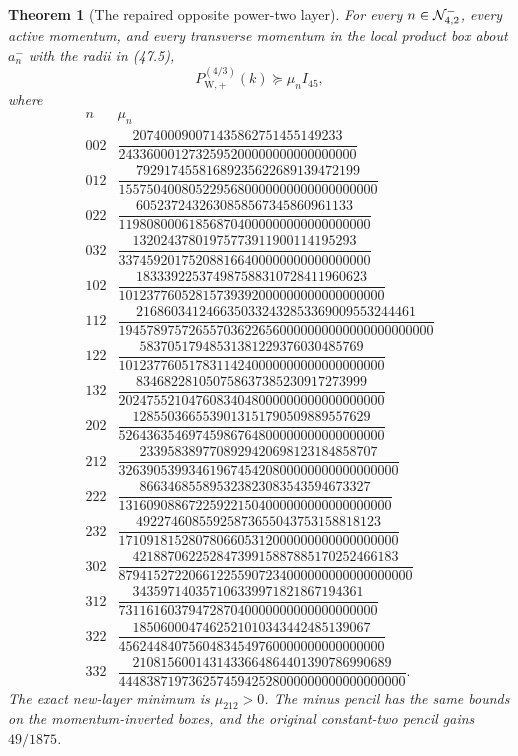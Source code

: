 \documentclass[11pt,oneside]{article}
\newtheorem{theorem}{Theorem}[section]
\theoremstyle{definition}
\theoremstyle{remark}
\begin{document}
\begin{theorem}[The repaired opposite power-two layer]
\label{thm:newv47-sixteen-charts}
For every \(n\in{\cal N}_{4,2}^{-}\), every active momentum, and
every transverse momentum in the local product box about \(a_n^-\)
with the radii in (47.5),
\[
 P_{\mathrm W,+}^{(4/3)}(k)\succeq\mu_n I_{45},        \tag{47.9}
\]
where
\[
\begin{array}{c|c}
n&\mu_n\\ \hline
002&\dfrac{207400090071435862751455149233}
{2433600012732595200000000000000000}\\[5pt]
012&\dfrac{79291745581689235622689139472199}
{1557504008052295680000000000000000000}\\[5pt]
022&\dfrac{6052372432630858567345860961133}
{119808000618568704000000000000000000}\\[5pt]
032&\dfrac{13202437801975773911900114195293}
{337459201752088166400000000000000000}\\[5pt]
102&\dfrac{183339225374987588310728411960623}
{10123776052815739392000000000000000000}\\[5pt]
112&\dfrac{2168603412466350332432853369009553244461}
{194578975726557036226560000000000000000000000}\\[5pt]
122&\dfrac{58370517948531381229376030485769}
{10123776051783114240000000000000000000}\\[5pt]
132&\dfrac{834682281050758637385230917273999}
{20247552104760834048000000000000000000}\\[5pt]
202&\dfrac{1285503665539013151790509889557629}
{52643635469745986764800000000000000000}\\[5pt]
212&\dfrac{2339583897708929420698123184858707}
{3263905399346196745420800000000000000000}\\[5pt]
222&\dfrac{866346855895323823083543594673327}
{131609088672259221504000000000000000000}\\[5pt]
232&\dfrac{49227460855925873655043753158818123}
{1710918152807806605312000000000000000000}\\[5pt]
302&\dfrac{42188706225284739915887885170252466183}
{879415272206612255907234000000000000000000}\\[5pt]
312&\dfrac{343597140357106339971821867194361}
{7311616037947287040000000000000000000}\\[5pt]
322&\dfrac{1850600047462521010343442485139067}
{45624484075604834549760000000000000000}\\[5pt]
332&\dfrac{2108156001431433664864401390786990689}
{44483871973625745942528000000000000000000}.
\end{array}                                             \tag{47.10}
\]
The exact new-layer minimum is \(\mu_{212}>0\).  The minus pencil
has the same bounds on the momentum-inverted boxes, and the
original constant-two pencil gains \(49/1875\).
\end{theorem}
\end{document}
